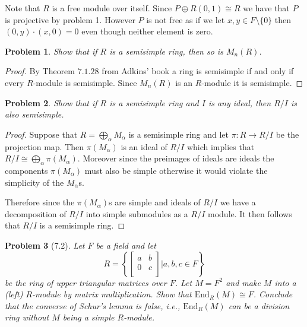 \documentclass[10pt]{article}
\newcommand{\sk}{\vskip 10mm}
\theoremstyle{plain}
\newtheorem{problem}{Problem}
\theoremstyle{remark}
\begin{document}
Note that $R$ is a free module over itself. Since $P\oplus R(0,1)\cong R$
we have that $P$ is projective by problem 1. However $P$ is
not free as if we let $x,y\in F\setminus\{0\}$ then $(0,y)\cdot(x,0)=0$ even
though neither element is zero.

\sk

\begin{problem}
  Show that if $R$ is a semisimple ring, then so is $M_n(R)$.
\end{problem}

\begin{proof}
  By Theorem $7.1.28$ from Adkins' book a ring is semisimple if and
  only if every $R$-module is semisimple. Since $M_n(R)$ is an $R$-module
  it is semisimple.
\end{proof}

\sk

\begin{problem}
  Show that if $R$ is a semisimple ring and $I$ is any ideal, then $R/I$
  is also semisimple.
\end{problem}

\begin{proof}
  Suppose that $R=\bigoplus_\alpha M_\alpha$ is a semisimple ring and let $\pi:R\rightarrow R/I$ be the
  projection map. Then $\pi(M_\alpha)$ is an ideal of $R/I$ which implies that
  $R/I\cong \bigoplus_\alpha \pi(M_\alpha)$. Moreover since the preimages of ideals are ideals
  the components $\pi(M_\alpha)$ must also be simple otherwise it would violate
  the simplicity of the $M_\alpha$s.

  Therefore since the $\pi(M_\alpha)$s are simple and ideals of $R/I$ we have
  a decomposition of $R/I$ into simple submodules as a $R/I$ module.
  It then follows that $R/I$ is a semisimple ring.
\end{proof}

\sk

\begin{problem}[7.2]
  Let $F$ be a field and let
  \[
    R =
    \left\{
      \left[
        \begin{array}{cc}
          a&b\\
          0&c\\
        \end{array}
      \right]
      |
      a,b,c\in F
    \right\}
  \]
  be the ring of upper triangular matrices over $F$. Let $M=F^2$ and make
  $M$ into a (left) $R$-module by matrix multiplication. Show that
  $\text{End}_R(M)\cong F$. Conclude that the converse of Schur's lemma
  is false, i.e., $\text{End}_R(M)$ can be a division ring without
  $M$ being a simple $R$-module.
\end{problem}
\end{document}
